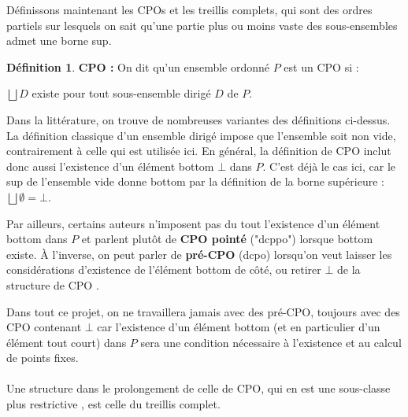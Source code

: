 \documentclass{article}
\newcommand{\yz}[1]{\textcolor{blue}{{[YZ:~#1]}}}
\theoremstyle{definition}
\newtheorem{definition}{Définition}[section]
\begin{document}
Définissons maintenant les CPOs et les treillis complets, qui sont des ordres partiels sur lesquels on sait qu'une partie plus ou moins vaste des sous-ensembles admet une borne sup.

\begin{definition}{\textbf{CPO :}}
On dit qu'un ensemble ordonné $P$ est un CPO si :


$\bigsqcup D$ existe pour tout sous-ensemble dirigé $D$ de $P$.
\end{definition}

Dans la littérature, on trouve de nombreuses variantes des définitions
ci-dessus. La définition classique d'un ensemble dirigé impose que l'ensemble soit non vide, contrairement à celle qui est utilisée ici. En général, la définition de CPO inclut donc aussi l'existence d'un élément bottom $\bot$ dans $P$. %
C'est déjà le cas ici, car le sup de l'ensemble vide donne bottom par la définition de la borne supérieure : ~ $\bigsqcup \emptyset = \bot$.


Par ailleurs, certains auteurs n'imposent pas du tout l'existence d'un élément bottom dans $P$ et parlent plutôt de \textbf{CPO pointé} ("dcppo") lorsque bottom existe. À l'inverse, on peut parler de \textbf{pré-CPO} (dcpo) lorsqu'on veut laisser les considérations d'existence de l'élément bottom de côté, ou retirer $\bot$ de la structure de CPO \cite[page 175]{main}.

Dans tout ce projet, on ne travaillera jamais avec des pré-CPO, toujours avec des CPO contenant $\bot$ car l'existence d'un élément bottom (et en particulier d'un élément tout court) dans $P$ sera une condition nécessaire à l'existence et au calcul de points fixes.

\paragraph{}

Une structure dans le prolongement de celle de CPO, qui en est une sous-classe plus restrictive %
, est celle du treillis complet.
\end{document}

